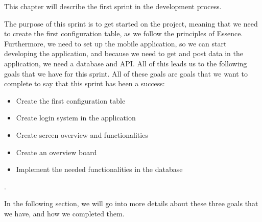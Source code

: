 This chapter will describe the first sprint in the development process.

The purpose of this sprint is to get started on the project, meaning that we need to create the first configuration table, as we follow the principles of Essence.
Furthermore, we need to set up the mobile application, so we can start developing the application, and because we need to get and post data in the application, we need a database and API.
All of this leads us to the following goals that we have for this sprint.
All of these goals are goals that we want to complete to say that this sprint has been a success:

\begin{itemize}
    \item Create the first configuration table 
    \item Create login system in the application
    \item Create screen overview and functionalities
    \item Create an overview board
    \item Implement the needed functionalities in the database
\end{itemize}.

In the following section, we will go into more details about these three goals that we have, and how we completed them.
